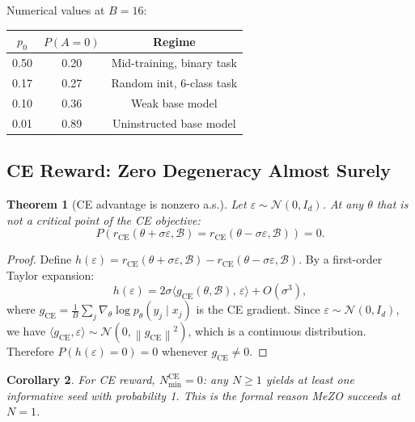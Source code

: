 \documentclass[11pt]{article}
\newtheorem{theorem}{Theorem}
\newtheorem{corollary}[theorem]{Corollary}
\theoremstyle{definition}
\theoremstyle{remark}
\newcommand{\norm}[1]{\left\|#1\right\|}
\newcommand{\Nmin}{N_{\mathrm{min}}}
\begin{document}
Numerical values at $B=16$:

\begin{center}
\begin{tabular}{ccc}
\toprule
$p_0$ & $P(A=0)$ & Regime\\
\midrule
0.50 & 0.20 & Mid-training, binary task\\
0.17 & 0.27 & Random init, 6-class task\\
0.10 & 0.36 & Weak base model\\
0.01 & 0.89 & Uninstructed base model\\
\bottomrule
\end{tabular}
\end{center}

\subsection{CE Reward: Zero Degeneracy Almost Surely}

\begin{theorem}[CE advantage is nonzero a.s.]
\label{thm:ce-nondegeneracy}
Let $\varepsilon \sim \mathcal{N}(0, I_d)$. At any $\theta$ that is not a critical point of the CE objective:
\begin{equation}
  P\!\left(r_{\mathrm{CE}}(\theta + \sigma\varepsilon, \mathcal{B}) = r_{\mathrm{CE}}(\theta - \sigma\varepsilon, \mathcal{B})\right) = 0.
\end{equation}
\end{theorem}

\begin{proof}
Define $h(\varepsilon) = r_{\mathrm{CE}}(\theta+\sigma\varepsilon, \mathcal{B}) - r_{\mathrm{CE}}(\theta-\sigma\varepsilon, \mathcal{B})$. By a first-order Taylor expansion:
\[
  h(\varepsilon) = 2\sigma\langle g_{\mathrm{CE}}(\theta, \mathcal{B}),\, \varepsilon \rangle + O(\sigma^3),
\]
where $g_{\mathrm{CE}} = \frac{1}{B}\sum_j \nabla_\theta \log p_\theta(y_j \mid x_j)$ is the CE gradient. Since $\varepsilon \sim \mathcal{N}(0, I_d)$, we have $\langle g_{\mathrm{CE}}, \varepsilon\rangle \sim \mathcal{N}(0, \norm{g_{\mathrm{CE}}}^2)$, which is a continuous distribution. Therefore $P(h(\varepsilon) = 0) = 0$ whenever $g_{\mathrm{CE}} \neq 0$.
\end{proof}

\begin{corollary}
For CE reward, $\Nmin^{\mathrm{CE}} = 0$: any $N \geq 1$ yields at least one informative seed with probability 1. This is the formal reason MeZO succeeds at $N=1$.
\end{corollary}
\end{document}
